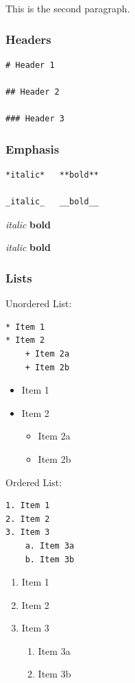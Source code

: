\documentclass[]{book}
\providecommand{\tightlist}{%
  \setlength{\itemsep}{0pt}\setlength{\parskip}{0pt}}
\theoremstyle{definition}
\theoremstyle{definition}
\theoremstyle{definition}
\theoremstyle{remark}
\begin{document}
This is the second paragraph.

\subsubsection{Headers}\label{headers}

\begin{verbatim}
# Header 1

## Header 2

### Header 3
\end{verbatim}

\subsubsection{Emphasis}\label{emphasis}

\begin{verbatim}
*italic*   **bold**

_italic_   __bold__
\end{verbatim}

\emph{italic} \textbf{bold}

\emph{italic} \textbf{bold}

\subsubsection{Lists}\label{lists}

Unordered List:

\begin{verbatim}
* Item 1
* Item 2
    + Item 2a
    + Item 2b
\end{verbatim}

\begin{itemize}
\tightlist
\item
  Item 1
\item
  Item 2

  \begin{itemize}
  \tightlist
  \item
    Item 2a
  \item
    Item 2b
  \end{itemize}
\end{itemize}

Ordered List:

\begin{verbatim}
1. Item 1
2. Item 2
3. Item 3
    a. Item 3a
    b. Item 3b
\end{verbatim}

\begin{enumerate}
\def\labelenumi{\arabic{enumi}.}
\tightlist
\item
  Item 1
\item
  Item 2
\item
  Item 3

  \begin{enumerate}
  \def\labelenumii{\alph{enumii}.}
  \tightlist
  \item
    Item 3a
  \item
    Item 3b
  \end{enumerate}
\end{enumerate}
\end{document}
